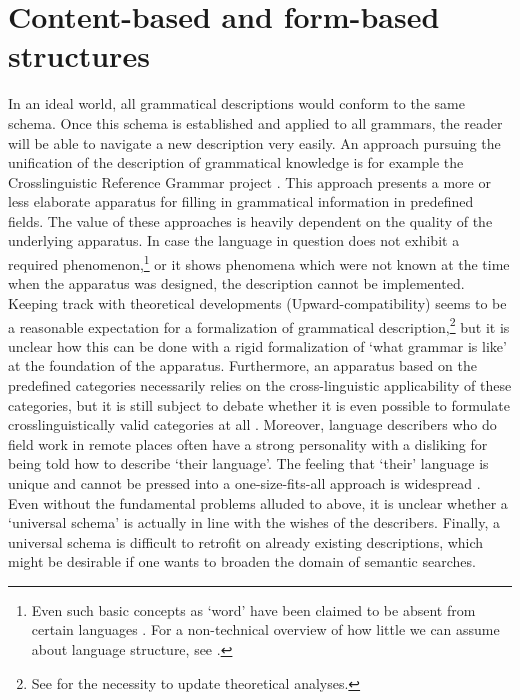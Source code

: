 \documentclass[a4paper,12pt]{article}
\begin{document}
\section{Content-based and form-based structures}
In an ideal world, all grammatical descriptions would conform to the same schema. Once this schema is established and applied to all grammars, the reader will be able to navigate a new description very easily. An approach pursuing the unification of the description of grammatical knowledge is for example the Crosslinguistic Reference Grammar project \citep{Peterson2002,Zaefferer2006}. This approach presents a more or less elaborate apparatus for filling in  grammatical information in predefined fields. The value of these approaches is heavily  dependent on the quality of the underlying apparatus. In case the language in question does not exhibit a required phenomenon,\footnote{Even such basic concepts as `word' have been claimed to be absent from certain languages \citep{SchieringEtAlfc}. For a non-technical overview of how little we can assume about language structure, see \citet{EvansEtAl2009BBS}.} or it shows phenomena which were not known at the time when the apparatus was designed, the description cannot be implemented. Keeping track with theoretical developments (Upward-compatibility) seems to be a reasonable expectation for a formalization of grammatical description,\footnote{See \citet{Mosel2006craft} for the necessity to update theoretical analyses.} but it is unclear how this can be done with a rigid formalization of `what grammar is like' at the foundation of the apparatus.  Furthermore, an apparatus based on the predefined categories necessarily relies on the cross-linguistic applicability of these categories, but it is still subject to debate whether it is even possible to formulate crosslinguistically valid categories at all \citep{Haspelmath2007LT}. Moreover, language describers who do field work in remote places often have a strong personality with a disliking for being told how to describe `their language'. The feeling that `their' language is unique and cannot be pressed into a one-size-fits-all approach is widespread \citep{Weber2006grow}. Even without the fundamental problems alluded to above, it is unclear whether a `universal schema' is actually in line with the wishes of the describers. Finally, a universal schema is difficult to retrofit on already existing descriptions, which might be desirable if one wants to broaden the domain of semantic searches.
\end{document}
